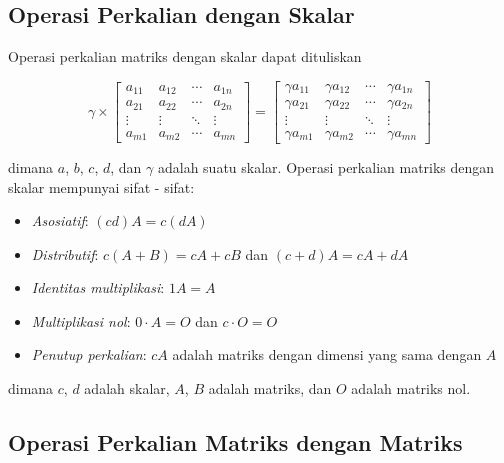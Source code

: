 \subsection{Operasi Perkalian dengan Skalar}
\label{Operasi Perkalian dengan Skalar}

Operasi perkalian matriks dengan skalar dapat dituliskan

\begin{equation}
	\label{eq:matrix_mult_scalar}\gamma \times
	\begin{bmatrix}
		a_{11} & a_{12} & \cdots & a_{1n} \\ a_{21}&a_{22}&\cdots&a_{2n}\\ \vdots&\vdots&\ddots&\vdots \\ a_{m1}&a_{m2}&\cdots&a_{mn}
	\end{bmatrix}
	=
	\begin{bmatrix}
		\gamma a_{11} & \gamma a_{12} & \cdots & \gamma a_{1n} \\ \gamma a_{21} & \gamma a_{22} & \cdots & \gamma a_{2n}\\ \vdots & \vdots & \ddots & \vdots \\ \gamma a_{m1} & \gamma a_{m2} & \cdots & \gamma a_{mn}
	\end{bmatrix}
\end{equation}

\noindent
dimana $a$, $b$, $c$, $d$, dan $\gamma$ adalah suatu skalar. Operasi perkalian matriks
dengan skalar mempunyai sifat - sifat:

\begin{itemize}
	\item \emph{Asosiatif}: $(cd) A = c (dA)$

	\item \emph{Distributif}: $c(A+B)=cA+cB$ dan $(c+d)A=cA+dA$

	\item \emph{Identitas multiplikasi}: $1 A = A$

	\item \emph{Multiplikasi nol}: $0\cdot A=O$ dan $c\cdot O= O$

	\item \emph{Penutup perkalian}: $cA$ adalah matriks dengan dimensi yang sama dengan
	      $A$
\end{itemize}

\noindent
dimana $c$, $d$ adalah skalar, $A$, $B$ adalah matriks, dan $O$ adalah matriks
nol.

\subsection{Operasi Perkalian Matriks dengan Matriks}
\label{Operasi Perkalian Matriks dengan Matriks}

